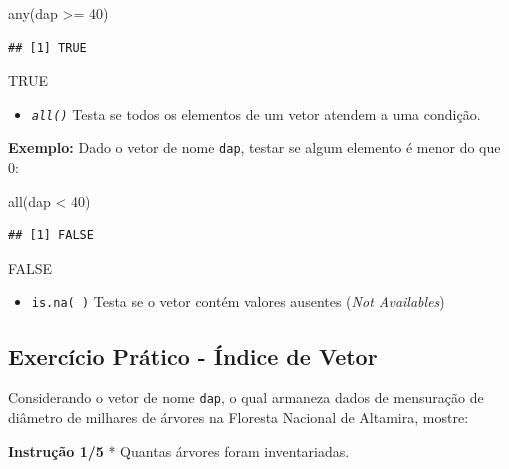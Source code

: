 \documentclass[
]{article}
\newenvironment{Shaded}{\begin{snugshade}}{\end{snugshade}}
\newcommand{\DecValTok}[1]{\textcolor[rgb]{0.00,0.00,0.81}{#1}}
\newcommand{\FunctionTok}[1]{\textcolor[rgb]{0.00,0.00,0.00}{#1}}
\newcommand{\NormalTok}[1]{#1}
\newcommand{\SpecialCharTok}[1]{\textcolor[rgb]{0.00,0.00,0.00}{#1}}
\providecommand{\tightlist}{%
  \setlength{\itemsep}{0pt}\setlength{\parskip}{0pt}}
\begin{document}
\begin{Shaded}
\begin{Highlighting}[]
\FunctionTok{any}\NormalTok{(dap }\SpecialCharTok{\textgreater{}=} \DecValTok{40}\NormalTok{)}
\end{Highlighting}
\end{Shaded}

\begin{verbatim}
## [1] TRUE
\end{verbatim}

TRUE

\begin{itemize}
\tightlist
\item
  \emph{\texttt{all()}} Testa se todos os elementos de um vetor atendem
  a uma condição.
\end{itemize}

\textbf{Exemplo:} Dado o vetor de nome \texttt{dap}, testar se algum
elemento é menor do que 0:

\begin{Shaded}
\begin{Highlighting}[]
\FunctionTok{all}\NormalTok{(dap }\SpecialCharTok{\textless{}} \DecValTok{40}\NormalTok{)}
\end{Highlighting}
\end{Shaded}

\begin{verbatim}
## [1] FALSE
\end{verbatim}

FALSE

\begin{itemize}
\tightlist
\item
  \texttt{is.na(\ )} Testa se o vetor contém valores ausentes (\emph{Not
  Availables})
\end{itemize}

\hypertarget{exercuxedcio-pruxe1tico---uxedndice-de-vetor}{%
\subsection{Exercício Prático - Índice de
Vetor}\label{exercuxedcio-pruxe1tico---uxedndice-de-vetor}}

Considerando o vetor de nome \texttt{dap}, o qual armaneza dados de
mensuração de diâmetro de milhares de árvores na Floresta Nacional de
Altamira, mostre:

\textbf{Instrução 1/5} * Quantas árvores foram inventariadas.

\begin{Shaded}
\begin{Highlighting}[]

\end{Highlighting}
\end{Shaded}
\end{document}
